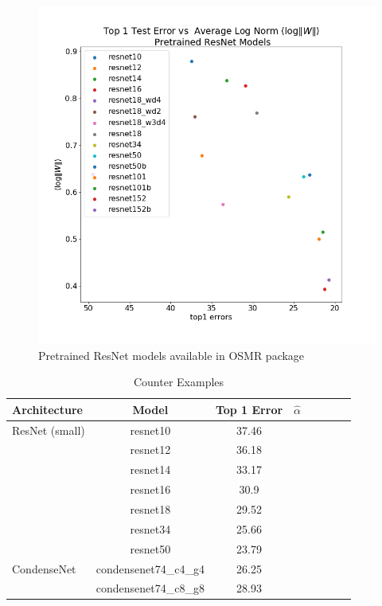 \begin{figure}[!htb]
 \centering
   \includegraphics[scale=0.30]{img/ResNet_top1-lognorms.png}
   \caption{
Pretrained ResNet models available in OSMR package}
  \label{fig:resnet}
\end{figure}





\begin{table}[t]
\small
\begin{center}
\begin{tabular}{|p{1in}|c|c|c|c|c|c|c|}
\hline
Architecture 
 & Model
 & Top 1 Error & $\hat{\alpha}$ \\
\hline
ResNet (small)  & resnet10 & 37.46 & \\
& resnet12 & 36.18 & \\
& resnet14 & 33.17 & \\
& resnet16 & 30.9 & \\
& resnet18 & 29.52 & \\
& resnet34 & 25.66 & \\
& resnet50 & 23.79 & \\
\hline
CondenseNet & condensenet74\_c4\_g4 & 26.25 & \\
& condensenet74\_c8\_g8 & 28.93 & \\
\hline
\end{tabular}
\end{center}
\caption{Counter Examples}
\label{table:models}
\end{table}



